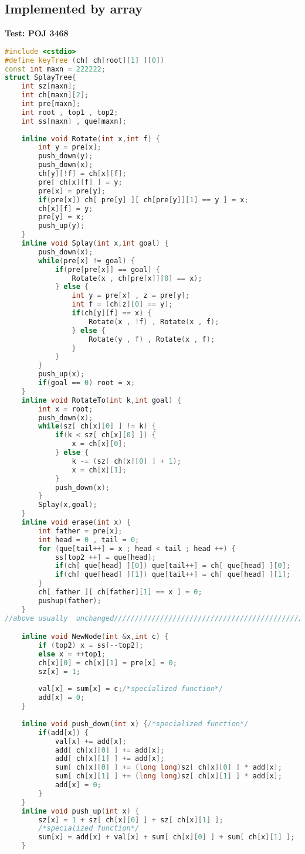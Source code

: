   \subsection{Implemented by array}
  \textbf{Test: POJ 3468}
  \begin{lstlisting}[language=C++]
#include <cstdio>
#define keyTree (ch[ ch[root][1] ][0])
const int maxn = 222222;
struct SplayTree{
	int sz[maxn];
	int ch[maxn][2];
	int pre[maxn];
	int root , top1 , top2;
	int ss[maxn] , que[maxn];
 
	inline void Rotate(int x,int f) {
		int y = pre[x];
		push_down(y);
		push_down(x);
		ch[y][!f] = ch[x][f];
		pre[ ch[x][f] ] = y;
		pre[x] = pre[y];
		if(pre[x]) ch[ pre[y] ][ ch[pre[y]][1] == y ] = x;
		ch[x][f] = y;
		pre[y] = x;
		push_up(y);
	}
	inline void Splay(int x,int goal) {
		push_down(x);
		while(pre[x] != goal) {
			if(pre[pre[x]] == goal) {
				Rotate(x , ch[pre[x]][0] == x);
			} else {
				int y = pre[x] , z = pre[y];
				int f = (ch[z][0] == y);
				if(ch[y][f] == x) {
					Rotate(x , !f) , Rotate(x , f);
				} else {
					Rotate(y , f) , Rotate(x , f);
				}
			}
		}
		push_up(x);
		if(goal == 0) root = x;
	}
	inline void RotateTo(int k,int goal) {
		int x = root;
		push_down(x);
		while(sz[ ch[x][0] ] != k) {
			if(k < sz[ ch[x][0] ]) {
				x = ch[x][0];
			} else {
				k -= (sz[ ch[x][0] ] + 1);
				x = ch[x][1];
			}
			push_down(x);
		}
		Splay(x,goal);
	}
	inline void erase(int x) {
		int father = pre[x];
		int head = 0 , tail = 0;
		for (que[tail++] = x ; head < tail ; head ++) {
			ss[top2 ++] = que[head];
			if(ch[ que[head] ][0]) que[tail++] = ch[ que[head] ][0];
			if(ch[ que[head] ][1]) que[tail++] = ch[ que[head] ][1];
		}
		ch[ father ][ ch[father][1] == x ] = 0;
		pushup(father);
	}
//above usually  unchanged//////////////////////////////////////////////

	inline void NewNode(int &x,int c) {
		if (top2) x = ss[--top2];
		else x = ++top1;
		ch[x][0] = ch[x][1] = pre[x] = 0;
		sz[x] = 1;
 
		val[x] = sum[x] = c;/*specialized function*/
		add[x] = 0;
	}
 
	inline void push_down(int x) {/*specialized function*/
		if(add[x]) {
			val[x] += add[x];
			add[ ch[x][0] ] += add[x];
			add[ ch[x][1] ] += add[x];
			sum[ ch[x][0] ] += (long long)sz[ ch[x][0] ] * add[x];
			sum[ ch[x][1] ] += (long long)sz[ ch[x][1] ] * add[x];
			add[x] = 0;
		}
	}
	inline void push_up(int x) {
		sz[x] = 1 + sz[ ch[x][0] ] + sz[ ch[x][1] ];
		/*specialized function*/
		sum[x] = add[x] + val[x] + sum[ ch[x][0] ] + sum[ ch[x][1] ];
	}
 

\end{lstlisting}
